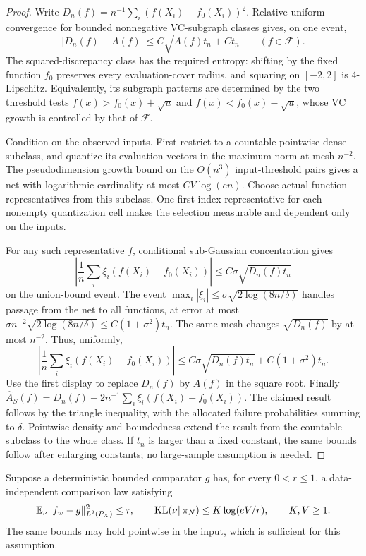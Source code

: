 \begin{proof}
Write $D_n(f)=n^{-1}\sum_i(f(X_i)-f_0(X_i))^2$. Relative uniform convergence for bounded nonnegative VC-subgraph classes gives, on one event,
\[
 |D_n(f)-A(f)|\le C\sqrt{A(f)t_n}+Ct_n\qquad(f\in\mathcal F).
\]
The squared-discrepancy class has the required entropy: shifting by the fixed function $f_0$ preserves every evaluation-cover radius, and squaring on $[-2,2]$ is 4-Lipschitz. Equivalently, its subgraph patterns are determined by the two threshold tests $f(x)>f_0(x)+\sqrt u$ and $f(x)<f_0(x)-\sqrt u$, whose VC growth is controlled by that of $\mathcal F$.

Condition on the observed inputs. First restrict to a countable pointwise-dense subclass, and quantize its evaluation vectors in the maximum norm at mesh $n^{-2}$. The pseudodimension growth bound on the $O(n^3)$ input-threshold pairs gives a net with logarithmic cardinality at most $C V\log(en)$. Choose actual function representatives from this subclass. One first-index representative for each nonempty quantization cell makes the selection measurable and dependent only on the inputs.

For any such representative $f$, conditional sub-Gaussian concentration gives
\[
 \left|\frac1n\sum_i\xi_i(f(X_i)-f_0(X_i))\right|
 \le C\sigma\sqrt{D_n(f)t_n}
\]
on the union-bound event. The event
$\max_i|\xi_i|\le\sigma\sqrt{2\log(8n/\delta)}$ handles passage from the net to all functions, at error at most
$\sigma n^{-2}\sqrt{2\log(8n/\delta)}\le C(1+\sigma^2)t_n$.
The same mesh changes $\sqrt{D_n(f)}$ by at most $n^{-2}$. Thus, uniformly,
\[
 \left|\frac1n\sum_i\xi_i(f(X_i)-f_0(X_i))\right|
 \le C\sigma\sqrt{D_n(f)t_n}+C(1+\sigma^2)t_n.
\]
Use the first display to replace $D_n(f)$ by $A(f)$ in the square root. Finally
$\widehat A_S(f)=D_n(f)-2n^{-1}\sum_i\xi_i(f(X_i)-f_0(X_i))$.
The claimed result follows by the triangle inequality, with the allocated failure probabilities summing to $\delta$. Pointwise density and boundedness extend the result from the countable subclass to the whole class. If $t_n$ is larger than a fixed constant, the same bounds follow after enlarging constants; no large-sample assumption is needed.
\end{proof}

Suppose a deterministic bounded comparator $g$ has, for every $0<r\le1$, a data-independent comparison law satisfying
\begin{equation}
 \mathbb E_\nu\|f_w-g\|_{L^2(P_X)}^2\le r,
 \qquad \operatorname{KL}(\nu\|\pi_N)\le K\log(eV/r),
 \qquad K,V\ge1.
 \label{eq:logarithmic-comparison-interface}
\end{equation}
The same bounds may hold pointwise in the input, which is sufficient for this assumption.

